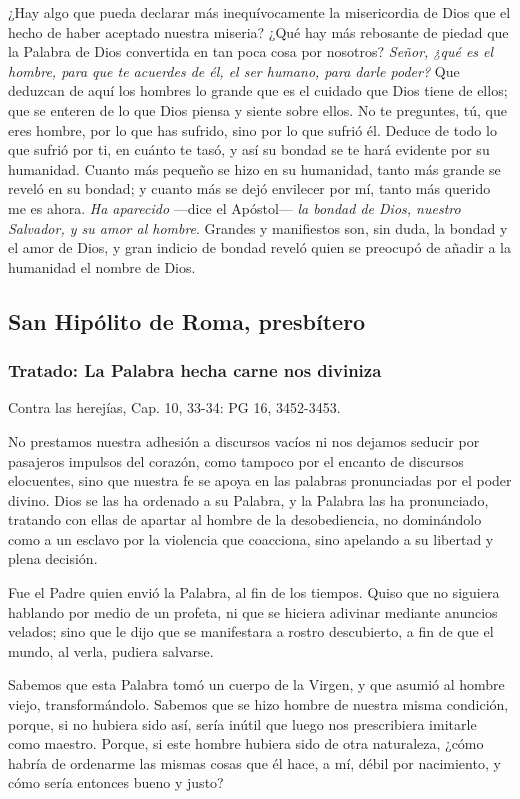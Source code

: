 \begin{body}
\begin{body}
¿Hay algo que pueda declarar más inequívocamente la misericordia de Dios que el hecho de haber aceptado nuestra miseria? ¿Qué hay más rebosante de piedad que la Palabra de Dios convertida en tan poca cosa por nosotros? \emph{Señor, ¿qué es el hombre, para que te acuerdes de él, el ser humano, para darle poder?} Que deduzcan de aquí los hombres lo grande que es el cuidado que Dios tiene de ellos; que se enteren de lo que Dios piensa y siente sobre ellos. No te preguntes, tú, que eres hombre, por lo que has sufrido, sino por lo que sufrió él. Deduce de todo lo que sufrió por ti, en cuánto te tasó, y así su bondad se te hará evidente por su humanidad. Cuanto más pequeño se hizo en su humanidad, tanto más grande se reveló en su bondad; y cuanto más se dejó envilecer por mí, tanto más querido me es ahora. \emph{Ha aparecido} ---dice el Apóstol--- \emph{la bondad de Dios, nuestro Salvador, y su amor al hombre}. Grandes y manifiestos son, sin duda, la bondad y el amor de Dios, y gran indicio de bondad reveló quien se preocupó de añadir a la humanidad el nombre de Dios.

\subsection{San Hipólito de Roma, presbítero}

\subsubsection{Tratado: La Palabra hecha carne nos diviniza}

Contra las herejías, Cap. 10, 33-34: PG 16, 3452-3453.

No prestamos nuestra adhesión a discursos vacíos ni nos dejamos seducir por pasajeros impulsos del corazón, como tampoco por el encanto de discursos elocuentes, sino que nuestra fe se apoya en las palabras pronunciadas por el poder divino. Dios se las ha ordenado a su Palabra, y la Palabra las ha pronunciado, tratando con ellas de apartar al hombre de la desobediencia, no dominándolo como a un esclavo por la violencia que coacciona, sino apelando a su libertad y plena decisión.

Fue el Padre quien envió la Palabra, al fin de los tiempos. Quiso que no siguiera hablando por medio de un profeta, ni que se hiciera adivinar mediante anuncios velados; sino que le dijo que se manifestara a rostro descubierto, a fin de que el mundo, al verla, pudiera salvarse.

Sabemos que esta Palabra tomó un cuerpo de la Virgen, y que asumió al hombre viejo, transformándolo. Sabemos que se hizo hombre de nuestra misma condición, porque, si no hubiera sido así, sería inútil que luego nos prescribiera imitarle como maestro. Porque, si este hombre hubiera sido de otra naturaleza, ¿cómo habría de ordenarme las mismas cosas que él hace, a mí, débil por nacimiento, y cómo sería entonces bueno y justo?


\end{body}
\end{body}
